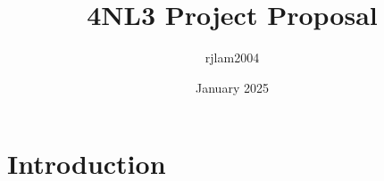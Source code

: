 \documentclass{article}
\title{4NL3 Project Proposal}
\author{rjlam2004 }
\date{January 2025}
\begin{document}
\maketitle

\section{Introduction}
\end{document}
